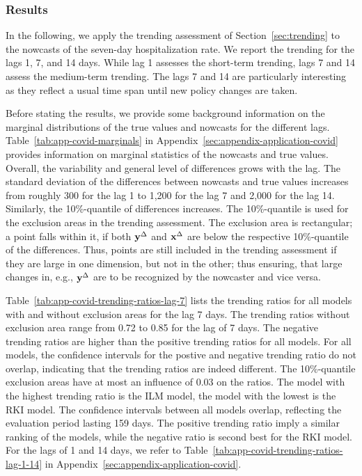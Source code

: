 \subsubsection*{Results}

In the following, we apply the trending assessment of Section~\ref{sec:trending} to the nowcasts of the seven-day hospitalization rate.
We report the trending for the lags 1, 7, and 14 days.
While lag 1 assesses the short-term trending, lags 7 and 14 assess the medium-term trending.
The lags 7 and 14 are particularly interesting as they reflect a usual time span until new policy changes are taken.

Before stating the results, we provide some background information on the marginal distributions of the true values and nowcasts for the different lags.
Table~\ref{tab:app-covid-marginals} in Appendix~\ref{sec:appendix-application-covid} provides information on marginal statistics of the nowcasts and true values.
Overall, the variability and general level of differences grows with the lag.
The standard deviation of the differences between nowcasts and true values increases from roughly 300 for the lag 1 to 1,200 for the lag 7 and 2,000 for the lag 14.
Similarly, the 10\%-quantile of differences increases.
The 10\%-quantile is used for the exclusion areas in the trending assessment.
The exclusion area is rectangular; a point falls within it, if both $\mathbf{y}^{\Delta}$ and $\mathbf{x}^{\Delta}$ are below the respective 10\%-quantile of the differences.
Thus, points are still included in the trending assessment if they are large in one dimension, but not in the other; thus ensuring, that large changes in, e.g., $\mathbf{y}^{\Delta}$ are to be recognized by the nowcaster and vice versa.

Table~\ref{tab:app-covid-trending-ratios-lag-7} lists the trending ratios for all models with and without exclusion areas for the lag 7 days.
The trending ratios without exclusion area range from 0.72 to 0.85 for the lag of 7 days.
The negative trending ratios are higher than the positive trending ratios for all models.
For all models, the confidence intervals for the postive and negative trending ratio do not overlap, indicating that the trending ratios are indeed different.
The 10\%-quantile exclusion areas have at most an influence of 0.03 on the ratios.
The model with the highest trending ratio is the ILM model, the model with the lowest is the RKI model.
The confidence intervals between all models overlap, reflecting the evaluation period lasting 159 days.
The positive trending ratio imply a similar ranking of the models, while the negative ratio is second best for the RKI model.
For the lags of 1 and 14 days, we refer to Table~\ref{tab:app-covid-trending-ratios-lag-1-14} in Appendix~\ref{sec:appendix-application-covid}.

